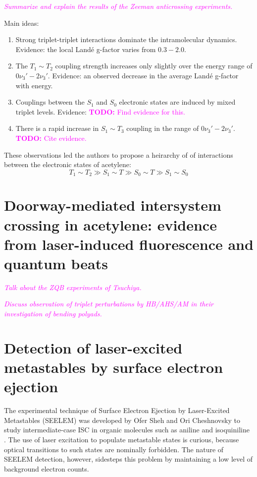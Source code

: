\documentclass[12pt]{mitthesis}
\newcommand{\TODO} [1]{\textcolor{magenta}{\textbf{TODO:} #1}}
\newcommand{\POINT}[1]{\textcolor{magenta}{\emph{#1}}}
\begin{document}
\POINT{Summarize and explain the results of the Zeeman anticrossing
  experiments.} 

Main ideas:
\begin{enumerate}

\item Strong triplet-triplet interactions dominate the intramolecular
  dynamics.  Evidence: the local Land\'{e} g-factor varies from
  $0.3-2.0$.

\item The $T_1 \sim T_2$ coupling strength increases only slightly over
  the energy range of $0\nu_3'-2\nu_3'$.  Evidence: an observed
  decrease in the average Land\'{e} g-factor with energy.

\item Couplings between the $S_1$ and $S_0$ electronic states are
  induced by mixed triplet levels.  Evidence: \TODO{Find evidence for
    this.}

\item There is a rapid increase in $S_1 \sim T_3$ coupling in the range of
  $0\nu_3'-2\nu_3'$. \TODO{Cite evidence.}

\end{enumerate}
These observations led the authors to propose a heirarchy of of
interactions between the electronic states of acetylene:
\begin{equation}
  T_1 \sim T_2 \gg S_1 \sim T \gg S_0 \sim T \gg S_1 \sim S_0
\end{equation}

\section{Doorway-mediated intersystem crossing in acetylene: evidence
  from laser-induced fluorescence and quantum beats}

\POINT{Talk about the ZQB experiments of Tsuchiya.}

\POINT{Discuss observation of triplet perturbations by HB/AHS/AM in
  their investigation of bending polyads.}


\section{Detection of laser-excited metastables by surface electron
  ejection}

The experimental technique of Surface Electron Ejection by
Laser-Excited Metastables (SEELEM) was developed by Ofer Sheh and Ori
Cheshnovsky to study intermediate-case ISC in organic molecules such
as aniline and isoquiniline \cite{sneh86, sneh88, sneh89a, sneh89b,
  sneh91}.  The use of laser excitation to populate metastable states
is curious, because optical transitions to such states are nominally
forbidden.  The nature of SEELEM detection, however, sidesteps this
problem by maintaining a low level of background electron counts.
\end{document}
